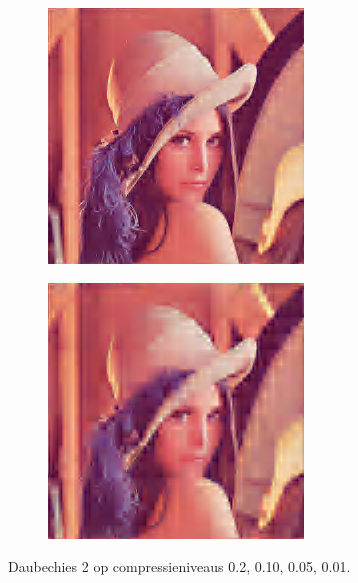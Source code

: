 \documentclass[11pt]{report}
\theoremstyle{plain}
\theoremstyle{remark}
\begin{document}
\begin{figure}
\begin{subfigure}[b]{0.24\textwidth}
	\end{subfigure}
	\begin{subfigure}[b]{0.24\textwidth}
		\centering
		\includegraphics[width=\textwidth]{plaatjes/Lenna_db2_0_03.png}
	\end{subfigure}
	\begin{subfigure}[b]{0.24\textwidth}
		\centering
		\includegraphics[width=\textwidth]{plaatjes/Lenna_db2_0_01.png}
	\end{subfigure}	
	\caption{Daubechies 2 op compressieniveaus 0.2, 0.10, 0.05, 0.01.}
\end{figure}
\end{document}
